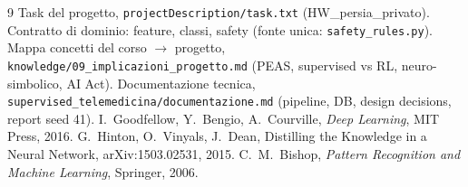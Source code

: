 \documentclass[11pt,a4paper]{article}
\newcommand{\file}[1]{\texttt{#1}}
\begin{document}
\begin{thebibliography}{9}
 Task del progetto, \file{projectDescription/task.txt} (HW\_persia\_privato).
 Contratto di dominio: feature, classi, safety (fonte unica: \file{safety\_rules.py}).
 Mappa concetti del corso $\to$ progetto, \file{knowledge/09\_implicazioni\_progetto.md} (PEAS, supervised vs RL, neuro-simbolico, AI Act).
 Documentazione tecnica, \file{supervised\_telemedicina/documentazione.md} (pipeline, DB, design decisions, report seed 41).
 I.~Goodfellow, Y.~Bengio, A.~Courville, \textit{Deep Learning}, MIT Press, 2016.
 G.~Hinton, O.~Vinyals, J.~Dean, Distilling the Knowledge in a Neural Network, arXiv:1503.02531, 2015.
 C.~M.~Bishop, \textit{Pattern Recognition and Machine Learning}, Springer, 2006.
\end{thebibliography}
\end{document}
